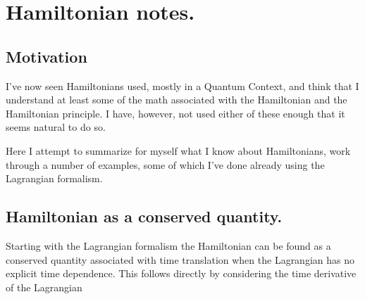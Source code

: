 

\chapter{Hamiltonian notes.}
\label{chap:hamiltonian}
{}
\date{Sept 26, 2009}

\beginArtWithToc

\section{Motivation}

I've now seen Hamiltonians used, mostly in a Quantum Context, and think that I understand at least some of the math associated with the Hamiltonian and the Hamiltonian principle.  I have, however, not used either of these enough that it seems natural to do so.

Here I attempt to summarize for myself what I know about Hamiltonians, work through a number of examples, some of which I've done already using the Lagrangian formalism.

\section{Hamiltonian as a conserved quantity.}

Starting with the Lagrangian formalism the Hamiltonian can be found as a conserved quantity associated with time translation when the Lagrangian has no explicit time dependence.  This follows directly by considering the time derivative of the Lagrangian



\EndArticle
